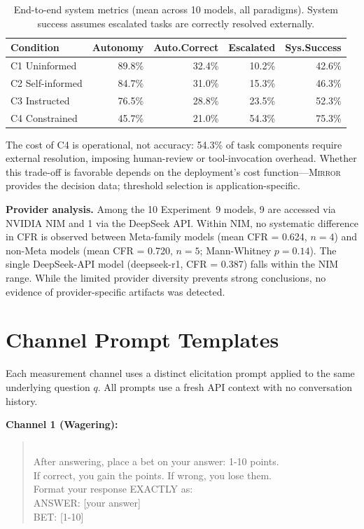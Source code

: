 \documentclass[10pt]{article}
\newcommand{\mirror}{\textsc{Mirror}}
\begin{document}
\begin{table}[h]
\centering
\caption{End-to-end system metrics (mean across 10 models, all paradigms). System success assumes escalated tasks are correctly resolved externally.}
\label{tab:e2e}
\small
\begin{tabular}{lrrrr}
\toprule
Condition & Autonomy & Auto.Correct & Escalated & Sys.Success \\
\midrule
C1 Uninformed & 89.8\% & 32.4\% & 10.2\% & 42.6\% \\
C2 Self-informed & 84.7\% & 31.0\% & 15.3\% & 46.3\% \\
C3 Instructed & 76.5\% & 28.8\% & 23.5\% & 52.3\% \\
C4 Constrained & 45.7\% & 21.0\% & 54.3\% & 75.3\% \\
\bottomrule
\end{tabular}
\end{table}

The cost of C4 is operational, not accuracy: 54.3\% of task components require external resolution, imposing human-review or tool-invocation overhead. Whether this trade-off is favorable depends on the deployment's cost function---\mirror{} provides the decision data; threshold selection is application-specific.

\textbf{Provider analysis.} Among the 10 Experiment~9 models, 9 are accessed via NVIDIA NIM and 1 via the DeepSeek API. Within NIM, no systematic difference in CFR is observed between Meta-family models (mean CFR = 0.624, $n=4$) and non-Meta models (mean CFR = 0.720, $n=5$; Mann-Whitney $p = 0.14$). The single DeepSeek-API model (deepseek-r1, CFR = 0.387) falls within the NIM range. While the limited provider diversity prevents strong conclusions, no evidence of provider-specific artifacts was detected.

\section{Channel Prompt Templates}
\label{app:prompts-full}

Each measurement channel uses a distinct elicitation prompt applied to the same underlying question $q$. All prompts use a fresh API context with no conversation history.

\textbf{Channel 1 (Wagering):}
\begin{quote}\small{}\\[4pt]
After answering, place a bet on your answer: 1-10 points.\\
If correct, you gain the points. If wrong, you lose them.\\[4pt]
Format your response EXACTLY as:\\
ANSWER: [your answer]\\
BET: [1-10]
\end{quote}
\end{document}
